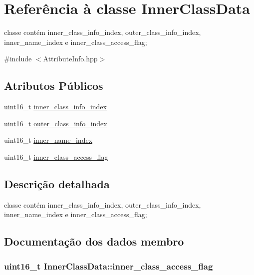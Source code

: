 \hypertarget{class_inner_class_data}{}\section{Referência à classe Inner\+Class\+Data}
\label{class_inner_class_data}


classe contém inner\+\_\+class\+\_\+info\+\_\+index, outer\+\_\+class\+\_\+info\+\_\+index, inner\+\_\+name\+\_\+index e inner\+\_\+class\+\_\+access\+\_\+flag;  




{\ttfamily \#include $<$Attribute\+Info.\+hpp$>$}

\subsection*{Atributos Públicos}
\begin{DoxyCompactItemize}
\item 
uint16\+\_\+t \hyperlink{class_inner_class_data_a58436b7ecd12950e542f64ee18906c59}{inner\+\_\+class\+\_\+info\+\_\+index}
\item 
uint16\+\_\+t \hyperlink{class_inner_class_data_a0370a0b4e7adc2b2524979040dc52f9d}{outer\+\_\+class\+\_\+info\+\_\+index}
\item 
uint16\+\_\+t \hyperlink{class_inner_class_data_af11ac765a0638f41283f42eb51b9064a}{inner\+\_\+name\+\_\+index}
\item 
uint16\+\_\+t \hyperlink{class_inner_class_data_a4c52c10364307d7be48aac8f7a5d88ed}{inner\+\_\+class\+\_\+access\+\_\+flag}
\end{DoxyCompactItemize}


\subsection{Descrição detalhada}
classe contém inner\+\_\+class\+\_\+info\+\_\+index, outer\+\_\+class\+\_\+info\+\_\+index, inner\+\_\+name\+\_\+index e inner\+\_\+class\+\_\+access\+\_\+flag; 

\subsection{Documentação dos dados membro}
\subsubsection[{\texorpdfstring{inner\+\_\+class\+\_\+access\+\_\+flag}{inner_class_access_flag}}]{\setlength{\rightskip}{0pt plus 5cm}uint16\+\_\+t Inner\+Class\+Data\+::inner\+\_\+class\+\_\+access\+\_\+flag}\hypertarget{class_inner_class_data_a4c52c10364307d7be48aac8f7a5d88ed}{}\label{class_inner_class_data_a4c52c10364307d7be48aac8f7a5d88ed}
